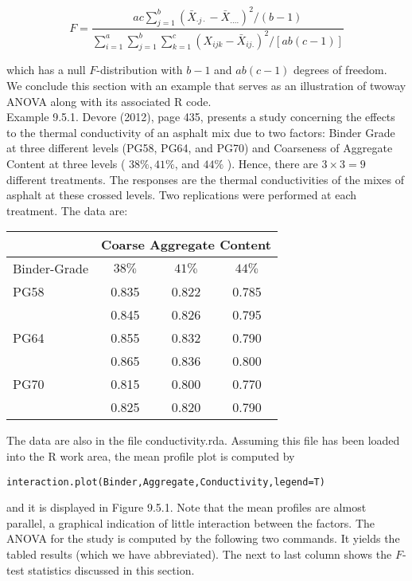 $$
F=\frac{a c \sum_{j=1}^{b}\left(\bar{X}_{\cdot j \cdot}-\bar{X}_{\ldots .}\right)^{2} /(b-1)}{\sum_{i=1}^{a} \sum_{j=1}^{b} \sum_{k=1}^{c}\left(X_{i j k}-\bar{X}_{i j .}\right)^{2} /[a b(c-1)]}
$$

which has a null $F$-distribution with $b-1$ and $a b(c-1)$ degrees of freedom.\\
We conclude this section with an example that serves as an illustration of twoway ANOVA along with its associated R code.\\
Example 9.5.1. Devore (2012), page 435, presents a study concerning the effects to the thermal conductivity of an asphalt mix due to two factors: Binder Grade at three different levels (PG58, PG64, and PG70) and Coarseness of Aggregate Content at three levels ( $38 \%, 41 \%$, and $44 \%$ ). Hence, there are $3 \times 3=9$ different treatments. The responses are the thermal conductivities of the mixes of asphalt at these crossed levels. Two replications were performed at each treatment. The data are:

\begin{center}
\begin{tabular}{|l|c|c|c|}
\hline
 & \multicolumn{3}{|c|}{Coarse Aggregate Content} \\
\hline
Binder-Grade & $38 \%$ & $41 \%$ & $44 \%$ \\
\hline
PG58 & 0.835 & 0.822 & 0.785 \\
 & 0.845 & 0.826 & 0.795 \\
\hline
PG64 & 0.855 & 0.832 & 0.790 \\
 & 0.865 & 0.836 & 0.800 \\
\hline
PG70 & 0.815 & 0.800 & 0.770 \\
 & 0.825 & 0.820 & 0.790 \\
\hline
\end{tabular}
\end{center}

The data are also in the file conductivity.rda. Assuming this file has been loaded into the R work area, the mean profile plot is computed by

\begin{verbatim}
interaction.plot(Binder,Aggregate,Conductivity,legend=T)
\end{verbatim}

and it is displayed in Figure 9.5.1. Note that the mean profiles are almost parallel, a graphical indication of little interaction between the factors. The ANOVA for the study is computed by the following two commands. It yields the tabled results (which we have abbreviated). The next to last column shows the $F$-test statistics discussed in this section.

